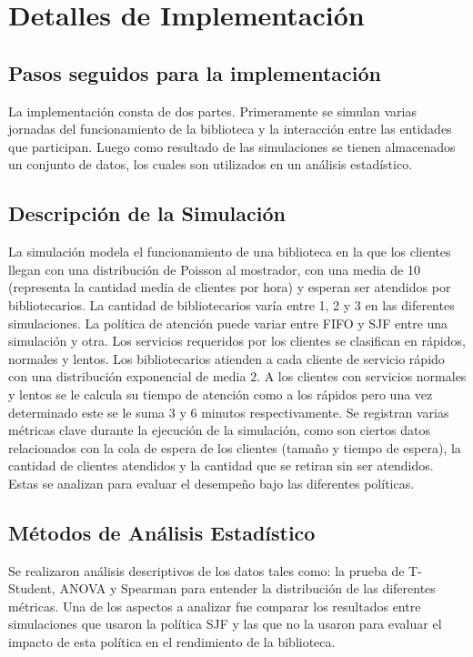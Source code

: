 \documentclass[10pt,twocolumn]{article}
\begin{document}

\section{Detalles de Implementación}

\subsection{Pasos seguidos para la implementación}
La implementación consta de dos partes. Primeramente se simulan varias jornadas del funcionamiento de la biblioteca y la interacción entre las entidades que participan. Luego como resultado de las simulaciones se tienen almacenados un conjunto de datos, los cuales son utilizados en un análisis estadístico.

\subsection{Descripción de la Simulación}
La simulación modela el funcionamiento de una biblioteca en la que los clientes llegan con una distribución de Poisson al mostrador, con una media de 10 (representa la cantidad media de clientes por hora) y esperan ser atendidos por bibliotecarios. La cantidad de bibliotecarios varía entre 1, 2 y 3 en las diferentes simulaciones. La política de atención puede variar entre FIFO y SJF entre una simulación y otra. Los servicios requeridos por los clientes se clasifican en rápidos, normales y lentos. Los bibliotecarios atienden a cada cliente de servicio rápido con una distribución exponencial de media 2. A los clientes con servicios normales y lentos se le calcula su tiempo de atención como a los rápidos pero una vez determinado este se le suma 3 y 6 minutos respectivamente.
Se registran varias métricas clave durante la ejecución de la simulación, como son ciertos datos relacionados con la cola de espera de los clientes (tamaño y tiempo de espera), la cantidad de clientes atendidos y la cantidad que se retiran sin ser atendidos. Estas se analizan para evaluar el desempeño bajo las diferentes políticas.

{\color{gray}
\subsection{Métodos de Análisis Estadístico}
Se realizaron análisis descriptivos de los datos tales como: la prueba de T-Student, ANOVA y Spearman para entender la distribución de las diferentes métricas. Una de los aspectos a analizar fue comparar los resultados entre simulaciones que usaron la política SJF y las que no la usaron para evaluar el impacto de esta política en el rendimiento de la biblioteca.
}
\end{document}
